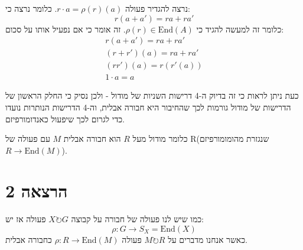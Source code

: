\documentclass{tstextbook}
\begin{document}
נרצה להגדיר פעולה \(r\cdot a = \rho(r)(a)\). כלומר נרצה כי:
$$r(a+a')=ra+ra'$$
כלומר זה למעשה להגיד כי \(\rho(r)\in \mathrm{End}(A)\). זה אומר כי אם נפעיל אותו על סכום:
\begin{gather*}r(a+a')=ra+ra' \\(r+r')(a)=ra+ra' \\(rr')(a)=r(r'(a)) \\1\cdot a = a
\end{gather*}

כעת ניתן לראות כי זה בדיוק ה-4 דרישות השניות של מודול - ולכן נסיק כי החלק הראשון של הדרישות של מודול גורמות לכך שהחיבור היא חבורה אבלית, וה-4 הדרישות הנותרות נועדו כדי לגרום לכך שיפעול כאנדומורפיזם. 

כלומר מודול מעל \(R\) הוא חבורה אבלית \(M\) עם פעולה של R(שנגזרת מהומומורפיזם \(R\to \mathrm{End}(M)\)).

\section{הרצאה 2}

כמו שיש לנו פעולה של חבורה על קבוצה \(X\circlearrowright G\) פעולה אז יש:
$$\rho:G\to S_{X}=\mathrm{End}(X)$$
כאשר אנחנו מדברים על \(M\circlearrowright R\) פעולה \(\rho:R\to \mathrm{End}(M)\) כחבורה אבלית.
\end{document}
